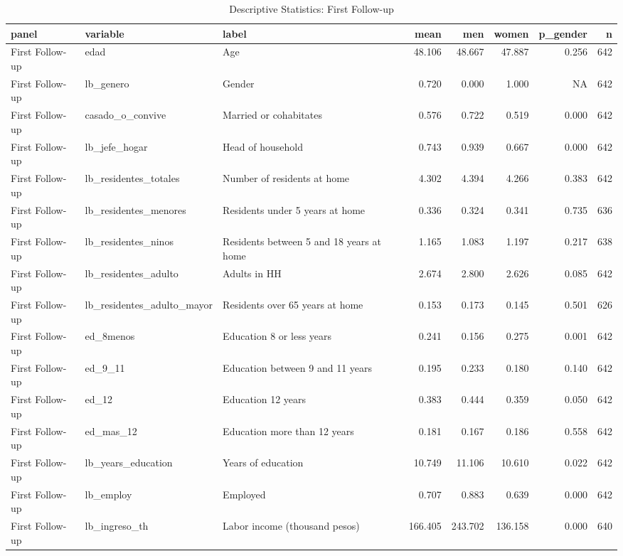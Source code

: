\begin{table}

\caption{Descriptive Statistics: First Follow-up}
\centering
\begin{tabular}[t]{lllrrrrr}
\toprule
panel & variable & label & mean & men & women & p\_gender & n\\
\midrule
First Follow-up & edad & Age & 48.106 & 48.667 & 47.887 & 0.256 & 642\\
First Follow-up & lb\_genero & Gender & 0.720 & 0.000 & 1.000 & NA & 642\\
First Follow-up & casado\_o\_convive & Married or cohabitates & 0.576 & 0.722 & 0.519 & 0.000 & 642\\
First Follow-up & lb\_jefe\_hogar & Head of household & 0.743 & 0.939 & 0.667 & 0.000 & 642\\
First Follow-up & lb\_residentes\_totales & Number of residents at home & 4.302 & 4.394 & 4.266 & 0.383 & 642\\
\addlinespace
First Follow-up & lb\_residentes\_menores & Residents under 5 years at home & 0.336 & 0.324 & 0.341 & 0.735 & 636\\
First Follow-up & lb\_residentes\_ninos & Residents between 5 and 18 years at home & 1.165 & 1.083 & 1.197 & 0.217 & 638\\
First Follow-up & lb\_residentes\_adulto & Adults in HH & 2.674 & 2.800 & 2.626 & 0.085 & 642\\
First Follow-up & lb\_residentes\_adulto\_mayor & Residents over 65 years at home & 0.153 & 0.173 & 0.145 & 0.501 & 626\\
First Follow-up & ed\_8menos & Education 8 or less years & 0.241 & 0.156 & 0.275 & 0.001 & 642\\
\addlinespace
First Follow-up & ed\_9\_11 & Education between 9 and 11 years & 0.195 & 0.233 & 0.180 & 0.140 & 642\\
First Follow-up & ed\_12 & Education 12 years & 0.383 & 0.444 & 0.359 & 0.050 & 642\\
First Follow-up & ed\_mas\_12 & Education more than 12 years & 0.181 & 0.167 & 0.186 & 0.558 & 642\\
First Follow-up & lb\_years\_education & Years of education & 10.749 & 11.106 & 10.610 & 0.022 & 642\\
First Follow-up & lb\_employ & Employed & 0.707 & 0.883 & 0.639 & 0.000 & 642\\
\addlinespace
First Follow-up & lb\_ingreso\_th & Labor income (thousand pesos) & 166.405 & 243.702 & 136.158 & 0.000 & 640\\

\end{tabular}
\end{table}
